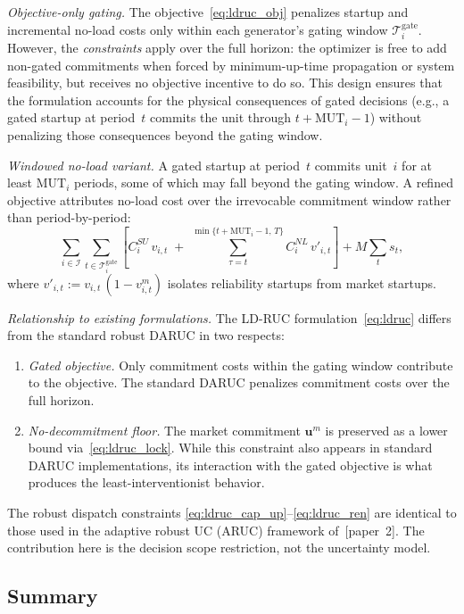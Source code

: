 \documentclass[journal]{IEEEtran}
\begin{document}
\emph{Objective-only gating.}
The objective~\eqref{eq:ldruc_obj} penalizes startup and
incremental no-load costs only within each generator's gating window
$\mathcal{T}_i^{\text{gate}}$.
However, the \emph{constraints} apply over the full horizon: the
optimizer is free to add non-gated commitments when forced by
minimum-up-time propagation or system feasibility, but receives no
objective incentive to do so.
This design ensures that the formulation accounts for the physical
consequences of gated decisions (e.g., a gated startup at period~$t$
commits the unit through $t + \text{MUT}_i - 1$) without penalizing
those consequences beyond the gating window.

\emph{Windowed no-load variant.}
A gated startup at period~$t$ commits unit~$i$ for at least
$\text{MUT}_i$ periods, some of which may fall beyond the gating
window.
A refined objective attributes no-load cost over the irrevocable
commitment window rather than period-by-period:
\begin{equation}\label{eq:obj_window}
\sum_{i \in \mathcal{I}}
\sum_{t \in \mathcal{T}_i^{\text{gate}}}
\!\left[
  C_i^{SU}\, v_{i,t}
  \;+\;
  \sum_{\tau=t}^{\min\{t+\text{MUT}_i-1,\,T\}}
    \!\! C_i^{NL}\, v'_{i,t}
\right]
+ M \!\sum_t s_t,
\end{equation}
where $v'_{i,t} := v_{i,t}\,(1 - v_{i,t}^m)$ isolates reliability
startups from market startups.

\emph{Relationship to existing formulations.}
The LD-RUC formulation~\eqref{eq:ldruc} differs from the standard
robust DARUC in two respects:
\begin{enumerate}
\item \emph{Gated objective.} Only commitment costs within the
  gating window contribute to the objective. The standard DARUC
  penalizes commitment costs over the full horizon.
\item \emph{No-decommitment floor.} The market commitment
  $\mathbf{u}^m$ is preserved as a lower bound via~\eqref{eq:ldruc_lock}.
  While this constraint also appears in standard DARUC implementations,
  its interaction with the gated objective is what produces the
  least-interventionist behavior.
\end{enumerate}
The robust dispatch constraints
\eqref{eq:ldruc_cap_up}--\eqref{eq:ldruc_ren} are identical to
those used in the adaptive robust UC (ARUC) framework
of~[paper~2].
The contribution here is the decision scope restriction, not the
uncertainty model.


\subsection{Summary}\label{sec:formulation_summary}
\end{document}
